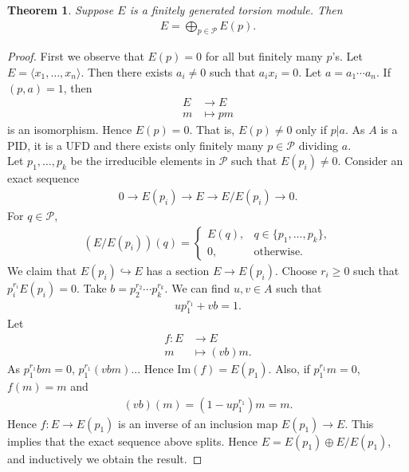 \documentclass[12pt]{report}
\theoremstyle{plain}
\newtheorem{theorem}{Theorem}[section]
\theoremstyle{remark}
\theoremstyle{definition}
\begin{document}
\begin{theorem}
    Suppose $E$ is a finitely generated torsion module. Then
    \begin{align*}
        E = \bigoplus_{p\in \mathcal{P}}E(p).
    \end{align*}
\end{theorem}
\begin{proof}
    First we observe that $E(p)=0$ for all but finitely many $p$'s. Let $E=\langle x_1,\dots,x_n\rangle$. Then there exists $a_i\neq 0$ such that $a_ix_i=0$. Let $a=a_1\cdots a_n$. If $(p,a)=1$, then
    \begin{align*}
        E&\to E \\
        m&\mapsto pm
    \end{align*}
    is an isomorphism. Hence $E(p)=0$. That is, $E(p)\neq 0$ only if $p|a$. As $A$ is a PID, it is a UFD and there exists only finitely many $p\in \mathcal{P}$ dividing $a$. \\
    Let $p_1,\dots,p_k$ be the irreducible elements in $\mathcal{P}$ such that $E(p_i)\neq 0$. Consider an exact sequence
    \begin{align*}
        0\to E(p_i) \to E\to E/E(p_i)\to 0.
    \end{align*}
    For $q\in \mathcal{P}$,
    \begin{align*}
        (E/E(p_i))(q) = \begin{cases}
            E(q), & q\in \{p_1,\dots,p_k\}, \\
            0, & \text{otherwise.}
        \end{cases}
    \end{align*}
    We claim that $E(p_i)\hookrightarrow E$ has a section $E\to E(p_i)$. Choose $r_i\ge 0$ such that $p_i^{r_i}E(p_i)=0$. Take $b=p_2^{r_2}\cdots p_k^{r_k}$. We can find $u,v\in A$ such that
    \begin{align*}
        up_1^{r_1}+vb = 1.
    \end{align*}
    Let
    \begin{align*}
        f:E&\to E \\
        m&\mapsto (vb)m.
    \end{align*}
    As $p_1^{r_1}bm = 0$, $p_1^{r_1}(vbm)$... Hence $\mathrm{Im}(f)= E(p_1)$. Also, if $p_1^{r_1}m=0$, $f(m)=m$ and
    \begin{align*}
        (vb)(m)=(1-up_1^{r_1})m=m.
    \end{align*}
    Hence $f:E\to E(p_1)$ is an inverse of an inclusion map $E(p_1)\to E$. This implies that the exact sequence above splits. Hence $E=E(p_1)\oplus E/E(p_1)$, and inductively we obtain the result.
\end{proof}
\end{document}
